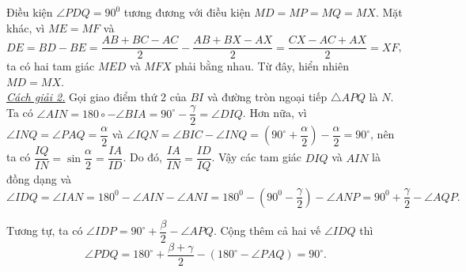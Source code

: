 \begin{ex}
{	 Điều kiện $\angle PDQ = 90^0$ tương đương với điều kiện $MD = MP = MQ=MX.$ Mặt khác, vì $ME=MF$ và
	 $DE=BD-BE = \dfrac{AB+BC-AC}{2} - \dfrac{AB+BX-AX}{2} = \dfrac{CX-AC+AX}{2}=XF$, ta có hai tam giác
	 $MED$ và $MFX$ phải bằng nhau. Từ đây, hiển nhiên $MD=MX$.\\
	 \textit{\underline{Cách giải 2.}} Gọi giao điểm thứ 2 của $BI$ và đường tròn ngoại tiếp $\triangle APQ$ là $N$. Ta có $\angle AIN = 180\circ - \angle BIA = 90^\circ - \dfrac{\gamma}{2} = \angle DIQ$. Hơn nữa,
	 vì $\angle INQ = \angle PAQ = \dfrac{\alpha}{2}$ và $\angle IQN = \angle BIC - \angle INQ = (90^\circ + \dfrac{\alpha}{2}) - \dfrac{\alpha}{2} =90^\circ$, nên ta có $\dfrac{IQ}{IN} = \sin \dfrac{\alpha}{2} = \dfrac{IA}{ID}$. Do đó, $\dfrac{IA}{IN} = \dfrac{ID}{IQ}$. Vậy các tam giác $DIQ$ và $AIN$ là đồng dạng và $\angle IDQ = \angle IAN = 180^0 - \angle AIN - \angle ANI = 180^0 - (90^0 - \dfrac{\gamma}{2}) - \angle ANP = 90^0 + \dfrac{\gamma}{2} - \angle AQP.$ 
	 
	 Tương tự, ta có $\angle IDP = 90^\circ + \dfrac{\beta}{2} - \angle APQ$. Cộng thêm cả hai vế $\angle IDQ$ thì $$\angle PDQ = 180^\circ + \dfrac{\beta + \gamma }{2} - (180^\circ - \angle PAQ) =90^\circ.$$
 }
\end{ex}

